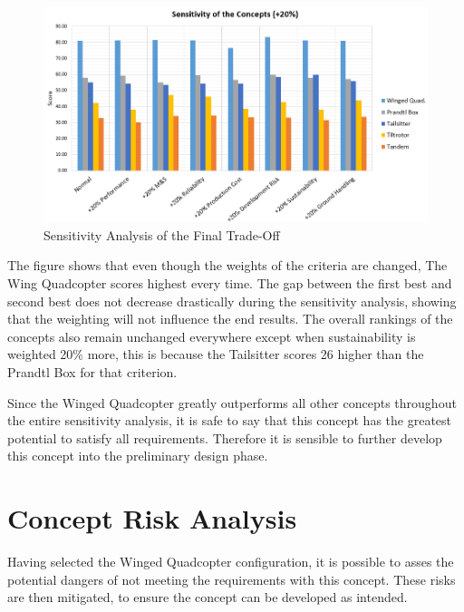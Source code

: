 \begin{figure}[htb]
    \centering
    \includegraphics[width=\textwidth]{ConceptTradeOff/Figures/sensitivity}
    \caption{Sensitivity Analysis of the Final Trade-Off}
    \label{fig:sensitivityanal}
\end{figure}

The figure shows that even though the weights of the criteria are changed, The Wing Quadcopter scores highest every time. The gap between the first best and second best does not decrease drastically during the sensitivity analysis, showing that the weighting will not influence the end results. The overall rankings of the concepts also remain unchanged everywhere except when sustainability is weighted 20\% more, this is because the Tailsitter scores 26 higher than the Prandtl Box for that criterion.

Since the Winged Quadcopter greatly outperforms all other concepts throughout the entire sensitivity analysis, it is safe to say that this concept has the greatest potential to satisfy all requirements. Therefore it is sensible to further develop this concept into the preliminary design phase.


\section{Concept Risk Analysis}%
\label{sec:conc_anal}



Having selected the Winged Quadcopter configuration, it is possible to asses the potential dangers of not meeting the requirements with this concept. These risks are then mitigated, to ensure the concept can be developed as intended.

